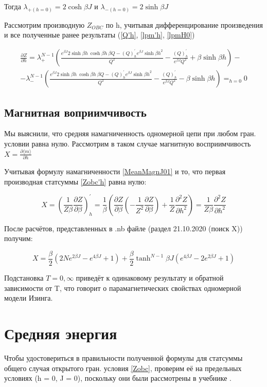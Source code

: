 \documentclass{article}
\newcommand{\bj}{\beta J}
\newcommand{\bh}{\beta h}
\newcommand{\lp}{\lambda_{+}}
\newcommand{\lm}{\lambda_{-}}
\newcommand{\dzdb}{\frac{\partial Z}{\partial \beta}}
\numberwithin{equation}{section}
\begin{document}
Тогда $ \lambda_{+ (h = 0)} = 2\cosh{\bj} $ и $ \lambda_{- (h = 0)} = 2\sinh{\bj} $

Рассмотрим производную $Z_{OBC}$ по h, учитывая дифференцирование произведения и все полученные ранее результаты (\eqref{Q'h}, \eqref{lpm'h}, \eqref{lpmH0})

\begin{multline}\label{Zobc'h}
    \frac{\partial Z}{\partial h} = \lp^{N-1}(\frac{e^{\bj}2\sinh{\bh}\ \cosh{\bh}\ \beta Q - (Q)^{'}_{h}e^{\bj}\sinh{\bh}^{2}}{Q^{2}} - \frac{(Q)^{'}_{h}}{e^{\bj}Q^{2}} + \beta\sinh{\bh}) - 
    \\
    - \lm^{N-1}(\frac{e^{\bj}2\sinh{\bh}\ \cosh{\bh}\ \beta Q - (Q)^{'}_{h}e^{\bj}\sinh{\bh}^{2}}{Q^{2}} - \frac{(Q)^{'}_{h}}{e^{\bj}Q^{2}} - \beta\sinh{\bh}) =_{h=0} 0
\end{multline} 


\subsection{Магнитная воприимчивость}

Мы выяснили, что средняя намагниченность одномерной цепи при любом гран. условии равна нулю. Рассмотрим в таком случае магнитную восприимчивость $ X = \frac{\partial \langle m \rangle}{\partial h}$

Учитывая формулу намагниченности \eqref{MeanMagnJ01} и то, что первая производная статсуммы \eqref{Zobc'h} равна нулю:

\[ X = (\frac{1}{Z \beta} \dzdb)^{'}_{h} = \frac{1}{\beta} (\dzdb (- \frac{1}{Z^{2}} \dzdb) + \frac{1}{Z} \frac{\partial^{2} Z}{\partial h^{2}}) = \frac{1}{Z \beta} \frac{\partial^{2} Z}{\partial h^{2}}\]

После расчётов, представленных в .nb файле (раздел 21.10.2020 (поиск X)) получим:

\[ X = \frac{\beta}{2} (2Ne^{2\bj} - e^{4\bj} + 1) + \frac{\beta}{2} \tanh^{N-1}\bj (e^{4\bj} - 2 e^{2\bj} + 1)\]

Подстановка $ T = 0, \infty$ приведёт к одинаковому результату и обратной зависимости от T, что говорит о парамагнетических свойствах одномерной модели Изинга.

\section{Средняя энергия}

Чтобы удостовериться в правильности полученной формулы для статсуммы общего случая открытого гран. условия \eqref{Zobc}, проверим её на предельных условиях (h = 0, J = 0), поскольку они были рассмотрены в учебнике \cite{Swen}.
\end{document}
